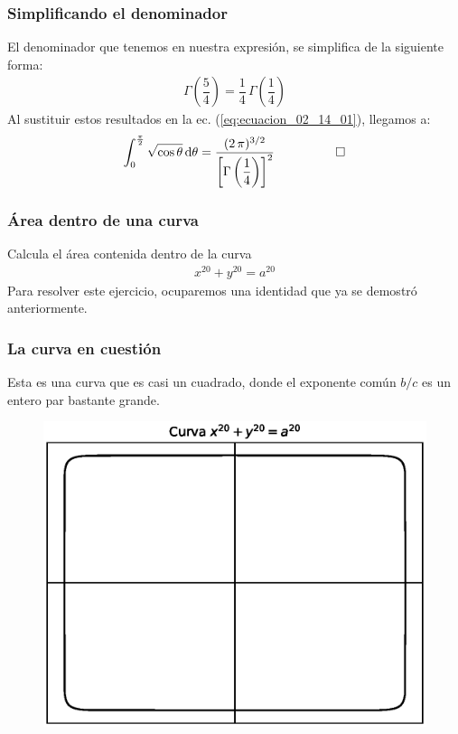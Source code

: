 \documentclass[12pt]{beamer}
\begin{document}
\begin{frame}
\frametitle{Simplificando el denominador}
El denominador que tenemos en nuestra expresión, se simplifica de la siguiente forma:
\pause
\begin{align*}
\Gamma \left( \dfrac{5}{4} \right) = \dfrac{1}{4} \, \Gamma \left( \dfrac{1}{4} \right)
\end{align*}
\pause
Al sustituir estos resultados en la ec. (\ref{eq:ecuacion_02_14_01}), llegamos a:
\begin{align*}
\int_{0}^{\frac{\pi}{2}} \sqrt{\cos \theta} \dd{\theta} = \dfrac{(2 \, \pi)^{3/2}}{\left[ \Gamma \left( \dfrac{1}{4} \right) \right]^{2}} \hspace{1cm} \qed
\end{align*}
\end{frame}
\begin{frame}
\frametitle{Área dentro de una curva}
Calcula el área contenida dentro de la curva
\begin{align*}
x^{20} + y^{20} = a^{20}
\end{align*}
\pause
Para resolver este ejercicio, ocuparemos una identidad que ya se demostró anteriormente.
\end{frame}
\begin{frame}
\frametitle{La curva en cuestión}
Esta es una curva que es casi un cuadrado, donde el exponente común $b / c$ es un entero par bastante grande.
\begin{figure}[H]
  \centering
  \includegraphics[scale=0.41]{Imagenes/plot_curva_estrella_03.eps}
\end{figure}
\end{frame}
\end{document}
